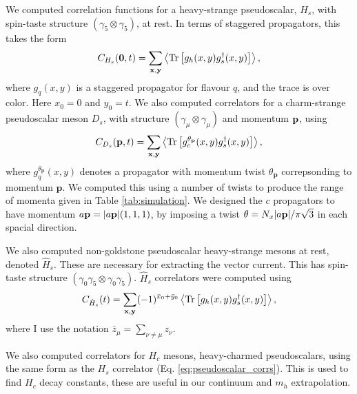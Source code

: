 

We computed correlation functions for a heavy-strange pseudoscalar, $H_s$, with spin-taste structure $(\gamma_5\otimes \gamma_5)$, at rest. In terms of staggered propagators, this takes the form
\begin{align}
  C_{H_s}({\textbf{0}},t) = \sum_{\bf{x},\bf{y}} \left\langle \text{Tr}\left[ g_h(x,y) g_s^{\dagger}(x,y) \right] \right\rangle,
  \label{eq:pseudoscalar_corrs}
\end{align}
where $g_q(x,y)$ is a staggered propagator for flavour $q$, and the trace is over color. Here $x_0=0$ and $y_0=t$. We also computed correlators for a charm-strange pseudoscalar meson $D_s$, with structure $(\gamma_{\mu}\otimes \gamma_{\mu})$ and momentum ${\bf{p}}$, using
\begin{align}
  C_{D_s}({\textbf{p}},t) = \sum_{\bf{x},\bf{y}} \left\langle \text{Tr}\left[ g^{\theta_{\textbf{p}}}_c(x,y) g_s^{\dagger}(x,y) \right] \right\rangle,
\end{align}
where $g_q^{\theta_{\textbf{p}}}(x,y)$ denotes a propagator with momentum twist $\theta_{\textbf{p}}$ correpsonding to momentum ${\textbf{p}}$. We computed this using a number of twists to produce the range of momenta given in Table \ref{tab:simulation}. We designed the $c$ propagators to have momentum $a{\bf{p}} = |a{\bf{p}}|(1,1,1)$, by imposing a twist $\theta = N_x |a{\bf{p}}| / \pi \sqrt{3}$ in each spacial direction.

We also computed non-goldstone pseudoscalar heavy-strange mesons at rest, denoted $\hat{H}_s$. These are necessary for extracting the vector current. This has spin-taste structure $(\gamma_0\gamma_5\otimes \gamma_0\gamma_5)$. $\hat{H}_s$ correlators were computed using
\begin{align}
  C_{\hat{H}_s}(t) = \sum_{\bf{x},\bf{y}}(-1)^{\bar{x}_0+\bar{y}_0} \left\langle \text{Tr}\left[ g_h(x,y) g^{\dagger}_s(x,y) \right] \right\rangle,
\end{align}
where I use the notation $\bar{z}_{\mu} = \sum_{\nu\neq\mu} z_{\nu}$.

We also computed correlators for $H_c$ mesons, heavy-charmed pseudoscalars, using the same form as the $H_s$ correlator (Eq. \eqref{eq:pseudoscalar_corrs}). This is used to find $H_c$ decay constants, these are useful in our continuum and $m_h$ extrapolation.

